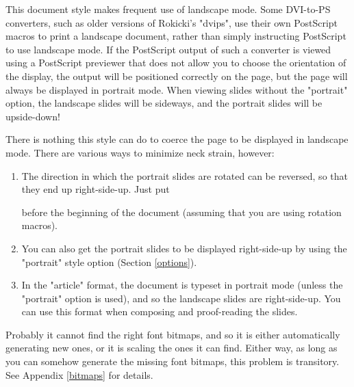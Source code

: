 \begin{slide}


This document style makes frequent use of landscape mode. Some DVI-to-PS
converters, such as older versions of Rokicki's "dvips", use their own
PostScript macros to print a landscape document, rather than simply
instructing PostScript to use landscape mode.
If the PostScript output of such a converter is viewed using a PostScript
previewer that does not allow you to choose the orientation of the display,
the output will be positioned correctly on the page, but the page will always
be displayed in portrait mode. When viewing slides without the "portrait"
option, the landscape slides will be sideways, and the portrait slides will be
upside-down!

There is nothing this style can do to coerce the page to be displayed in
landscape mode. There are various ways to minimize neck strain, however:
\begin{enumerate}
\item The direction in which the portrait slides are rotated can be reversed,
so that they end up right-side-up. Just put
\begin{LVerbatim}
\end{LVerbatim}
before the beginning of the document (assuming that you are using rotation
macros).
\item You can also get the portrait slides to be displayed right-side-up by
using the "portrait" style option (Section \ref{options}).
\item In the "article" format, the document is typeset in portrait mode
(unless the "portrait" option is used), and so the landscape slides are
right-side-up. You can use this format when composing and proof-reading the
slides.
\end{enumerate}


Probably it cannot find the right font bitmaps, and so it is either
automatically generating new ones, or it is scaling the ones it can find.
Either way, as long as you can somehow generate the missing font bitmaps, this
problem is transitory. See Appendix \ref{bitmaps} for details.


\end{slide}
